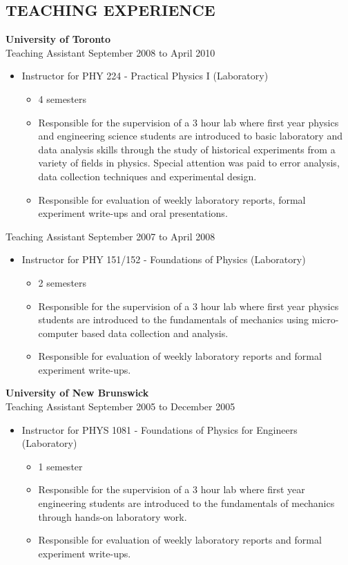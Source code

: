 \documentclass[margin]{res}
\begin{document}
\begin{resume}
\section{TEACHING EXPERIENCE}

{\bf University of Toronto} \\
Teaching Assistant \hfill September 2008 to April 2010 
\begin{itemize}
\item Instructor for PHY 224 - Practical  Physics I (Laboratory)
  \begin{itemize}
    \item 4 semesters
    \item Responsible for the supervision of a 3 hour lab where first year physics and engineering science students are introduced to basic laboratory and data analysis skills through the study of historical experiments from a variety of fields in physics.  Special attention was paid to error analysis, data collection techniques and experimental design.
    \item Responsible for evaluation of weekly laboratory reports, formal experiment write-ups and oral presentations.
  \end{itemize}
\end{itemize}

Teaching Assistant \hfill September 2007 to April 2008 
\begin{itemize}
\item Instructor for PHY 151/152 - Foundations of Physics  (Laboratory)
  \begin{itemize}
    \item 2 semesters
    \item Responsible for the supervision of a 3 hour lab where first year physics students are introduced to the fundamentals of mechanics using micro-computer based data collection and analysis.
    \item Responsible for evaluation of weekly laboratory reports and formal experiment write-ups.
  \end{itemize}
\end{itemize}


{\bf University of New Brunswick} \\
Teaching Assistant \hfill September 2005 to December 2005 
\begin{itemize}
\item Instructor for PHYS 1081 - Foundations of Physics for Engineers (Laboratory)
  \begin{itemize}
    \item 1 semester
    \item Responsible for the supervision of a 3 hour lab where first year engineering students are introduced to the fundamentals of mechanics through hands-on laboratory work.
    \item Responsible for evaluation of weekly laboratory reports and formal experiment write-ups.
  \end{itemize}
\end{itemize}


\end{resume}
\end{document}
